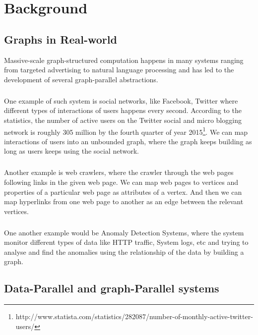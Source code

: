 \documentclass[12pt]{report}
\numberwithin{figure}{section}
\numberwithin{table}{section}
\begin{document}
\chapter{Background}
\section{Graphs in Real-world}
Massive-scale graph-structured computation happens in many systems ranging from targeted advertising to natural language processing and has led to the development of several graph-parallel abstractions. 

\paragraph{}

One example of such system is social networks, like Facebook, Twitter where different types of interactions of users happens every second. According to the statistics, the number of active users on the Twitter social and micro blogging network is roughly 305 million by the fourth quarter of  year 2015\footnote{http://www.statista.com/statistics/282087/number-of-monthly-active-twitter-users/}. We can map interactions of users into an unbounded graph, where the graph keeps building as long as users keeps using the social network.

\paragraph{}

Another example is web crawlers, where the crawler through the web pages following links in the given web page. We can map web pages to vertices and properties of a particular web page as attributes of a vertex. And then we can map hyperlinks from one web page to another as an edge between the relevant vertices.  

\paragraph{}

One another example would be Anomaly  Detection Systems, where the system monitor different types of data like HTTP traffic, System logs, etc and trying to analyse and find the anomalies using the relationship of the data by building a graph.

\section{Data-Parallel and graph-Parallel systems}
\end{document}
